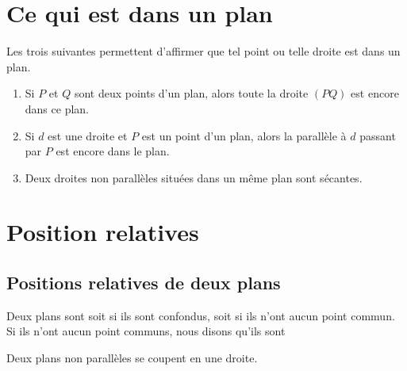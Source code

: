 \section{Ce qui est dans un plan}

Les trois suivantes permettent d'affirmer que tel point ou telle droite est dans un plan.
\begin{enumerate}
    \item
        Si \( P\) et \( Q\) sont deux points d'un plan, alors toute la droite \( (PQ)\) est encore dans ce plan.
    \item
        Si \( d\) est une droite et \( P\) est un point d'un plan, alors la parallèle à \( d\) passant par \( P\) est encore dans le plan.
    \item
        Deux droites non parallèles situées dans un même plan sont sécantes.
\end{enumerate}

\section{Position relatives}

\subsection{Positions relatives de deux plans}

\begin{definition}
    Deux plans sont  soit si ils sont confondus, soit si ils n'ont aucun point commun. Si ils n'ont aucun point communs, nous disons qu'ils sont 
\end{definition}

\begin{Aretenir}
    Deux plans non parallèles se coupent en une droite.
\end{Aretenir}

